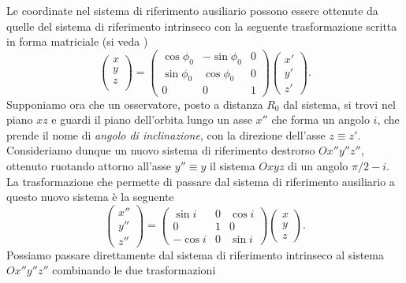 {Le coordinate nel sistema di riferimento ausiliario possono essere ottenute da
quelle del sistema di riferimento intrinseco con la seguente trasformazione
scritta in forma matriciale (si veda \textcite{goldstein:meccanica})
\begin{equation}
  \begin{pmatrix}
    x \\
    y \\
    z \\
  \end{pmatrix} =
  \begin{pmatrix}
    \cos\phi_0 & -\sin\phi_0 & 0 \\
    \sin\phi_0 & \cos\phi_0  & 0 \\
    0          & 0           & 1
  \end{pmatrix}
  \begin{pmatrix}
    x' \\
    y' \\
    z'
  \end{pmatrix}.
\end{equation}
Supponiamo ora che un osservatore, posto a distanza $R_0$ dal sistema, si trovi
nel piano $xz$ e guardi il piano dell'orbita lungo un asse $x''$ che forma un
angolo $i$, che prende il nome di \emph{angolo di inclinazione}, con la
direzione dell'asse $z\equiv z'$. Consideriamo dunque un nuovo sistema di
riferimento destrorso $Ox''y''z''$, ottenuto ruotando attorno all'asse
$y''\equiv y$ il sistema $Oxyz$ di un angolo $\pi/2 - i$. La trasformazione che
permette di passare dal sistema di riferimento ausiliario a questo nuovo sistema
è la seguente
\begin{equation}
  \begin{pmatrix}
    x'' \\
    y'' \\
    z''
  \end{pmatrix} =
  \begin{pmatrix}
    \sin i  & 0 & \cos i \\
    0       & 1 & 0      \\
    -\cos i & 0 & \sin i
  \end{pmatrix}
  \begin{pmatrix}
    x \\
    y \\
    z
  \end{pmatrix}.
\end{equation}
Possiamo passare direttamente dal sistema di riferimento intrinseco al sistema
$Ox''y''z''$ combinando le due trasformazioni
}

